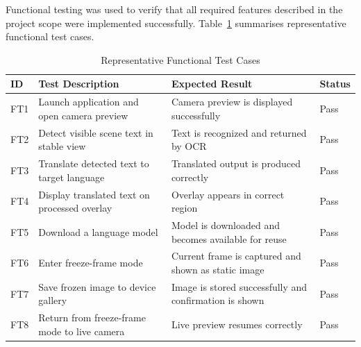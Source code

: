Functional testing was used to verify that all required features described in the project scope were implemented successfully. Table~\ref{tab:functional-tests} summarises representative functional test cases.

\begin{table}[h]
    \centering
    \caption{Representative Functional Test Cases}
    \label{tab:functional-tests}
    \begin{tabular}{|p{1.2cm}|p{4.8cm}|p{4.8cm}|p{2.2cm}|}
        \hline
        \textbf{ID} & \textbf{Test Description} & \textbf{Expected Result} & \textbf{Status} \\ \hline
        FT1 & Launch application and open camera preview & Camera preview is displayed successfully & Pass \\ \hline
        FT2 & Detect visible scene text in stable view & Text is recognized and returned by OCR & Pass \\ \hline
        FT3 & Translate detected text to target language & Translated output is produced correctly & Pass \\ \hline
        FT4 & Display translated text on processed overlay & Overlay appears in correct region & Pass \\ \hline
        FT5 & Download a language model & Model is downloaded and becomes available for reuse & Pass \\ \hline
        FT6 & Enter freeze-frame mode & Current frame is captured and shown as static image & Pass \\ \hline
        FT7 & Save frozen image to device gallery & Image is stored successfully and confirmation is shown & Pass \\ \hline
        FT8 & Return from freeze-frame mode to live camera & Live preview resumes correctly & Pass \\ \hline
    \end{tabular}
\end{table}

